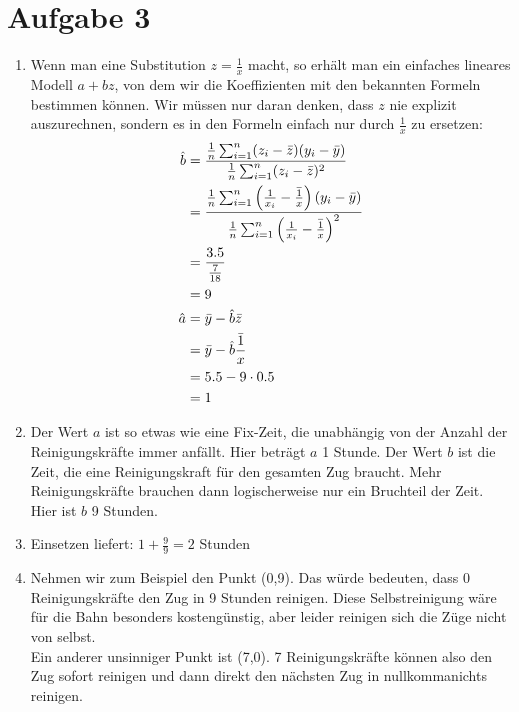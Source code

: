 \documentclass{article}
\begin{document}
	\section*{Aufgabe 3}
	\begin{enumerate}[label=(\alph*)]
		\item Wenn man eine Substitution $z=\frac{1}{x}$ macht, so erhält man ein einfaches lineares Modell $a+bz$, von dem wir die Koeffizienten mit den bekannten Formeln bestimmen können. Wir müssen nur daran denken, dass $z$ nie explizit auszurechnen, sondern es in den Formeln einfach nur durch $\frac{1}{x}$ zu ersetzen:
		\begin{align}
			\hat{b} &= \frac{\frac{1}{n}\sum_{i=1}^{n} (z_i-\bar{z})(y_i-\bar{y})}{\frac{1}{n}\sum_{i=1}^n (z_i-\bar{z})^2} \notag \\
			&= \frac{\frac{1}{n}\sum_{i=1}^{n} \left(\frac{1}{x_i}-\bar{\frac{1}{x}}\right)(y_i-\bar{y})}{\frac{1}{n}\sum_{i=1}^n \left(\frac{1}{x_i}-\bar{\frac{1}{x}}\right)^2} \notag \\
			&= \frac{3.5}{\frac{7}{18}} \notag \\
			&= 9 \notag \\
			\hat{a} &= \bar{y} - \hat{b}\bar{z} \notag \\
			&= \bar{y} - \hat{b}\bar{\frac{1}{x}} \notag \\
			&= 5.5 - 9\cdot 0.5 \notag \\
			&= 1 \notag
		\end{align}
		\item Der Wert $a$ ist so etwas wie eine Fix-Zeit, die unabhängig von der Anzahl der Reinigungskräfte immer anfällt. Hier beträgt $a$ 1 Stunde. Der Wert $b$ ist die Zeit, die eine Reinigungskraft für den gesamten Zug braucht. Mehr Reinigungskräfte brauchen dann logischerweise nur ein Bruchteil der Zeit. Hier ist $b$ 9 Stunden.
		\item Einsetzen liefert: $1+\frac{9}{9}=2$ Stunden
		\item Nehmen wir zum Beispiel den Punkt (0,9). Das würde bedeuten, dass 0 Reinigungskräfte den Zug in 9 Stunden reinigen. Diese Selbstreinigung wäre für die Bahn besonders kostengünstig, aber leider reinigen sich die Züge nicht von selbst. \\
		Ein anderer unsinniger Punkt ist (7,0). 7 Reinigungskräfte können also den Zug sofort reinigen und dann direkt den nächsten Zug in nullkommanichts reinigen.
	\end{enumerate}
	
\end{document}
